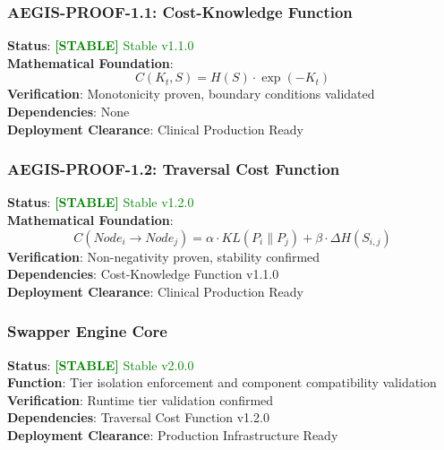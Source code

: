 \documentclass[11pt,letterpaper]{article}
\newcommand{\stablecomponent}[1]{\textcolor{green}{\textbf{[STABLE]} #1}}
\begin{document}
% 
% 
% 

\subsubsection{AEGIS-PROOF-1.1: Cost-Knowledge Function}
\textbf{Status}: \stablecomponent{Stable v1.1.0} \\
\textbf{Mathematical Foundation}: 
\begin{equation}
C(K_t, S) = H(S) \cdot \exp(-K_t)
\end{equation}
\textbf{Verification}: Monotonicity proven, boundary conditions validated \\
\textbf{Dependencies}: None \\
\textbf{Deployment Clearance}: Clinical Production Ready

\subsubsection{AEGIS-PROOF-1.2: Traversal Cost Function}
\textbf{Status}: \stablecomponent{Stable v1.2.0} \\
\textbf{Mathematical Foundation}:
\begin{equation}
C(Node_i \rightarrow Node_j) = \alpha \cdot KL(P_i \parallel P_j) + \beta \cdot \Delta H(S_{i,j})
\end{equation}
\textbf{Verification}: Non-negativity proven, stability confirmed \\
\textbf{Dependencies}: Cost-Knowledge Function v1.1.0 \\
\textbf{Deployment Clearance}: Clinical Production Ready

\subsubsection{Swapper Engine Core}
\textbf{Status}: \stablecomponent{Stable v2.0.0} \\
\textbf{Function}: Tier isolation enforcement and component compatibility validation \\
\textbf{Verification}: Runtime tier validation confirmed \\
\textbf{Dependencies}: Traversal Cost Function v1.2.0 \\
\textbf{Deployment Clearance}: Production Infrastructure Ready
\end{document}
